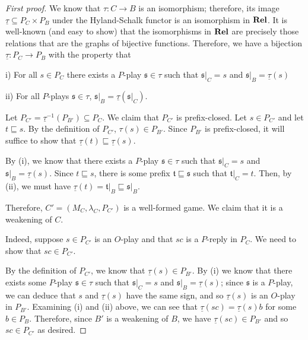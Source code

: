 \documentclass[11pt]{article} %
\theoremstyle{plain} %
\theoremstyle{definition} %
\theoremstyle{note}
\theoremstyle{exercisestyle}
\newcommand{\catname}[1]{{\normalfont\textbf{#1}}}
\newcommand{\Rel}{\catname{Rel}}
\newcommand*\from{\colon}
\newcommand{\cmap}[3]{#1\from{}#2\to{}#3}
\def \inv {^{-1}}
\newcommand{\s}{\mathfrak s}
\renewcommand{\t}{\mathfrak t}
\newcommand{\prefix}{\sqsubseteq}
\newcommand{\grel}[1]{\underline{#1}}
\renewcommand{\subset}{\subseteq}
\begin{document}
\begin{proof}[First proof]
  We know that $\cmap{\tau}{C}{B}$ is an isomorphism; therefore, its image $\grel\tau\subset P_C\times P_B$ under the Hyland-Schalk functor is an isomorphism in $\Rel$.  It is well-known (and easy to show) that the isomorphisms in $\Rel$ are precisely those relations that are the graphs of bijective functions.  Therefore, we have a bijection $\cmap{\grel\tau}{P_C}{P_B}$ with the property that

  i) For all $s\in P_C$ there exists a $P$-play $\s\in\tau$ such that $\s\vert_C=s$ and $\s\vert_B=\grel\tau(s)$

  ii) For all $P$-plays $\s\in\tau$, $\s\vert_B=\grel\tau\left(\s\vert_C\right)$.

  Let $P_{C'}=\grel\tau\inv(P_{B'})\subseteq P_C$.  We claim that $P_{C'}$ is prefix-closed.  Let $s\in P_{C'}$ and let $t\prefix s$.  By the definition of $P_{C'}$, $\tau(s)\in P_{B'}$.  Since $P_{B'}$ is prefix-closed, it will suffice to show that $\grel\tau(t)\prefix\grel\tau(s)$.

  By (i), we know that there exists a $P$-play $\s\in\tau$ such that $\s\vert_C = s$ and $\s\vert_B = \grel\tau(s)$.  Since $t\prefix s$, there is some prefix $\t\prefix\s$ such that $\t\vert_C = t$.  Then, by (ii), we must have $\grel\tau(t)=\t\vert_B\prefix\s\vert_B$.

  Therefore, $C'=(M_C,\lambda_C, P_{C'})$ is a well-formed game.  We claim that it is a weakening of $C$.  

  Indeed, suppose $s\in P_{C'}$ is an $O$-play and that $sc$ is a $P$-reply in $P_C$.  We need to show that $sc\in P_{C'}$.  

  By the definition of $P_{C'}$, we know that $\grel\tau(s)\in P_{B'}$.  By (i) we know that there exists some $P$-play $\s\in\tau$ such that $\s\vert_C=s$ and $\s\vert_B=\grel\tau(s)$; since $\s$ is a $P$-play, we can deduce that $s$ and $\grel\tau(s)$ have the same sign, and so $\grel\tau(s)$ is an $O$-play in $P_{B'}$.  Examining (i) and (ii) above, we can see that $\grel\tau(sc)=\grel\tau(s)b$ for some $b\in P_B$.  Therefore, since $B'$ is a weakening of $B$, we have $\grel\tau(sc)\in P_{B'}$ and so $sc\in P_{C'}$ as desired.


\end{proof}
\end{document}
